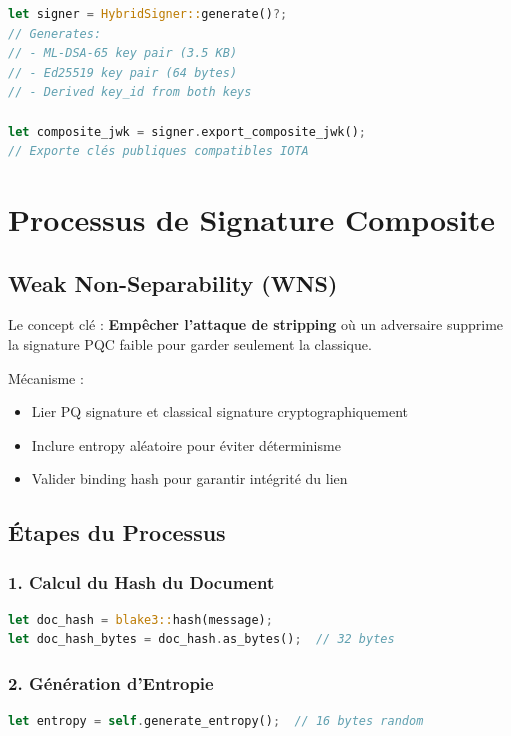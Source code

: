 \documentclass[12pt,a4paper]{report}
\begin{document}
\begin{lstlisting}[language=Rust]
let signer = HybridSigner::generate()?;
// Generates:
// - ML-DSA-65 key pair (3.5 KB)
// - Ed25519 key pair (64 bytes)
// - Derived key_id from both keys

let composite_jwk = signer.export_composite_jwk();
// Exporte clés publiques compatibles IOTA
\end{lstlisting}

\section{Processus de Signature Composite}

\subsection{Weak Non-Separability (WNS)}

Le concept clé : \textbf{Empêcher l'attaque de stripping} où un adversaire supprime la signature PQC faible pour garder seulement la classique.

Mécanisme :
\begin{itemize}
  \item Lier PQ signature et classical signature cryptographiquement
  \item Inclure entropy aléatoire pour éviter déterminisme
  \item Valider binding hash pour garantir intégrité du lien
\end{itemize}

\subsection{Étapes du Processus}

\subsubsection{1. Calcul du Hash du Document}

\begin{lstlisting}[language=Rust]
let doc_hash = blake3::hash(message);
let doc_hash_bytes = doc_hash.as_bytes();  // 32 bytes
\end{lstlisting}

\subsubsection{2. Génération d'Entropie}

\begin{lstlisting}[language=Rust]
let entropy = self.generate_entropy();  // 16 bytes random
\end{lstlisting}
\end{document}
